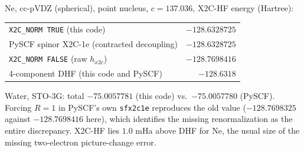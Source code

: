 \documentclass[11pt]{article}
\begin{document}
Ne, cc-pVDZ (spherical), point nucleus, $c=137.036$, X2C-HF energy (Hartree):
\begin{center}
\begin{tabular}{lr}
\texttt{X2C\_NORM TRUE} (this code) & $-128.6328725$\\
PySCF spinor X2C-1e (contracted decoupling) & $-128.6328725$\\
\texttt{X2C\_NORM FALSE} (raw $h_{x2c}$) & $-128.7698416$\\
4-component DHF (this code and PySCF) & $-128.6318$\\
\end{tabular}
\end{center}
Water, STO-3G: total $-75.0057781$ (this code) vs.\ $-75.0057780$ (PySCF). Forcing $R=1$ in PySCF's own
\texttt{sfx2c1e} reproduces the old value ($-128.7698325$ against $-128.7698416$ here), which identifies the missing
renormalization as the entire discrepancy. X2C-HF lies $1.0$ mHa above DHF for Ne, the usual size of the
missing two-electron picture-change error.
\end{document}
